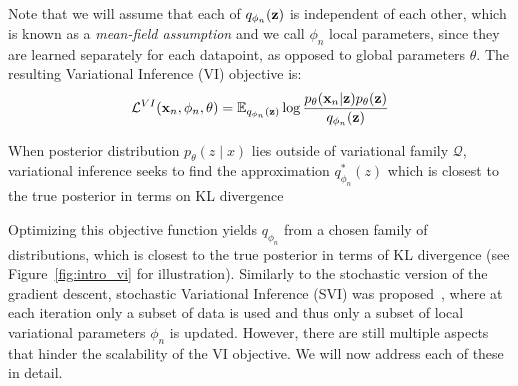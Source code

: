 Note that we will assume that each of $q_{\phi_n}({\mathbf{z}})$ is independent of each other, which is known as a \textit{mean-field assumption} and we call $\phi_n$ local parameters, since they are learned separately for each datapoint, as opposed to global parameters $\theta$. The resulting Variational Inference (VI) objective is: 
\begin{equation}
     \mathcal{L}^{VI}({\mathbf{x}}_n, \phi_n, \theta) =  \mathbb{E}_{q_{\phi_n}({\mathbf{z}})}\log  \frac{p_{\theta}({\mathbf{x}}_n|{\mathbf{z}})p_{\theta}({\mathbf{z}})}{q_{\phi_n}({\mathbf{z}})}
\end{equation}
\begin{marginfigure}
\caption{When posterior distribution $ p_{\theta}(z \mid x) $ lies outside of variational family $\mathcal{Q}$, variational inference seeks to find the approximation $q^*_{\phi_n}(z) $ which is closest to the true posterior in terms on KL divergence} \label{fig:intro_vi}
\end{marginfigure}
Optimizing this objective function yields $q_{\phi_n}$ from a chosen family of distributions, which is closest to the true posterior in terms of KL divergence (see Figure~\ref{fig:intro_vi} for illustration). Similarly to the stochastic version of the gradient descent, stochastic Variational Inference (SVI) was proposed~\citep{hoffman2013stochastic}, where at each iteration only a subset of data is used and thus only a subset of local variational parameters $\phi_n$ is updated. 
However, there are still multiple aspects that hinder the scalability of the VI objective. We will now address each of these in detail. 


